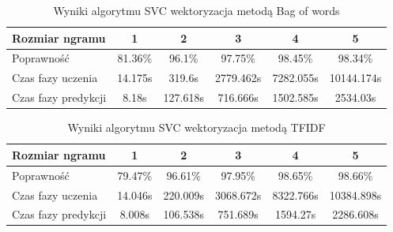 \begin{table}[H]
    \centering
    \caption{Wyniki algorytmu Naive Bayes wektoryzacja metodą TFIDF}
\end{table}

\begin{table}[H]
    \centering
    \caption{Wyniki algorytmu SVC wektoryzacja metodą Bag of words}
    \begin{tabular}{ | l | c | c | c | c | c |}
        \hline
        Rozmiar ngramu & 1 & 2 & 3 & 4 & 5 \\ \hline
        Poprawność & 81.36\% & 96.1\% & 97.75\% & 98.45\% & 98.34\%   \\ \hline
        Czas fazy uczenia & 14.175s & 319.6s & 2779.462s & 7282.055s & 10144.174s  \\ \hline
        Czas fazy predykcji & 8.18s & 127.618s & 716.666s & 1502.585s & 2534.03s  \\ \hline
    \end{tabular}
\end{table}

\begin{table}[H]
    \centering
    \caption{Wyniki algorytmu SVC wektoryzacja metodą TFIDF}
    \begin{tabular}{ | l | c | c | c | c | c |}
        \hline
        Rozmiar ngramu & 1 & 2 & 3 & 4 & 5   \\ \hline
        Poprawność & 79.47\% & 96.61\% & 97.95\% & 98.65\% & 98.66\% \\ \hline
        Czas fazy uczenia & 14.046s & 220.009s & 3068.672s & 8322.766s & 10384.898s \\ \hline
        Czas fazy predykcji & 8.008s & 106.538s & 751.689s & 1594.27s & 2286.608s  \\ \hline
    \end{tabular}
\end{table}

